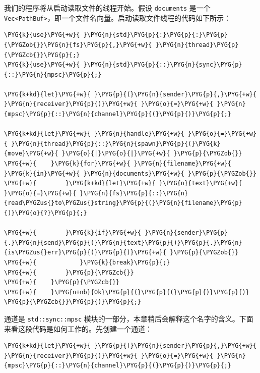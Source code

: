 我们的程序将从启动读取文件的线程开始。假设 \texttt{documents} 是一个 \texttt{Vec<PathBuf>}，即一个文件名向量。启动读取文件线程的代码如下所示：

\begin{Verbatim}[commandchars=\\\{\},breaklines=true,breakanywhere=true,fontsize=\codefont,xleftmargin=17bp]
\PYG{k}{use}\PYG{+w}{ }\PYG{n}{std}\PYG{p}{:}\PYG{p}{:}\PYG{p}{\PYGZob{}}\PYG{n}{fs}\PYG{p}{,}\PYG{+w}{ }\PYG{n}{thread}\PYG{p}{\PYGZcb{}}\PYG{p}{;}
\PYG{k}{use}\PYG{+w}{ }\PYG{n}{std}\PYG{p}{::}\PYG{n}{sync}\PYG{p}{::}\PYG{n}{mpsc}\PYG{p}{;}

\PYG{k+kd}{let}\PYG{+w}{ }\PYG{p}{(}\PYG{n}{sender}\PYG{p}{,}\PYG{+w}{ }\PYG{n}{receiver}\PYG{p}{)}\PYG{+w}{ }\PYG{o}{=}\PYG{+w}{ }\PYG{n}{mpsc}\PYG{p}{::}\PYG{n}{channel}\PYG{p}{(}\PYG{p}{)}\PYG{p}{;}

\PYG{k+kd}{let}\PYG{+w}{ }\PYG{n}{handle}\PYG{+w}{ }\PYG{o}{=}\PYG{+w}{ }\PYG{n}{thread}\PYG{p}{::}\PYG{n}{spawn}\PYG{p}{(}\PYG{k}{move}\PYG{+w}{ }\PYG{o}{|}\PYG{o}{|}\PYG{+w}{ }\PYG{p}{\PYGZob{}}
\PYG{+w}{    }\PYG{k}{for}\PYG{+w}{ }\PYG{n}{filename}\PYG{+w}{ }\PYG{k}{in}\PYG{+w}{ }\PYG{n}{documents}\PYG{+w}{ }\PYG{p}{\PYGZob{}}
\PYG{+w}{        }\PYG{k+kd}{let}\PYG{+w}{ }\PYG{n}{text}\PYG{+w}{ }\PYG{o}{=}\PYG{+w}{ }\PYG{n}{fs}\PYG{p}{::}\PYG{n}{read\PYGZus{}to\PYGZus{}string}\PYG{p}{(}\PYG{n}{filename}\PYG{p}{)}\PYG{o}{?}\PYG{p}{;}

\PYG{+w}{        }\PYG{k}{if}\PYG{+w}{ }\PYG{n}{sender}\PYG{p}{.}\PYG{n}{send}\PYG{p}{(}\PYG{n}{text}\PYG{p}{)}\PYG{p}{.}\PYG{n}{is\PYGZus{}err}\PYG{p}{(}\PYG{p}{)}\PYG{+w}{ }\PYG{p}{\PYGZob{}}
\PYG{+w}{            }\PYG{k}{break}\PYG{p}{;}
\PYG{+w}{        }\PYG{p}{\PYGZcb{}}
\PYG{+w}{    }\PYG{p}{\PYGZcb{}}
\PYG{+w}{    }\PYG{n+nb}{Ok}\PYG{p}{(}\PYG{p}{(}\PYG{p}{)}\PYG{p}{)}
\PYG{p}{\PYGZcb{}}\PYG{p}{)}\PYG{p}{;}
\end{Verbatim}

通道是 \texttt{std::sync::mpsc} 模块的一部分，本章稍后会解释这个名字的含义。下面来看这段代码是如何工作的。先创建一个通道：

\begin{Verbatim}[commandchars=\\\{\},breaklines=true,breakanywhere=true,fontsize=\codefont,xleftmargin=17bp]
\PYG{k+kd}{let}\PYG{+w}{ }\PYG{p}{(}\PYG{n}{sender}\PYG{p}{,}\PYG{+w}{ }\PYG{n}{receiver}\PYG{p}{)}\PYG{+w}{ }\PYG{o}{=}\PYG{+w}{ }\PYG{n}{mpsc}\PYG{p}{::}\PYG{n}{channel}\PYG{p}{(}\PYG{p}{)}\PYG{p}{;}
\end{Verbatim}

